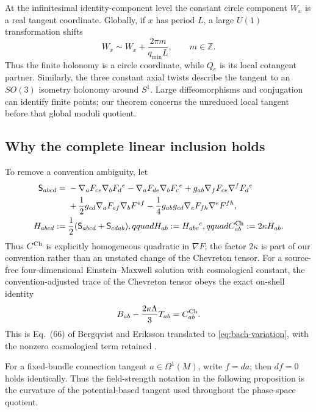 \documentclass[11pt]{article}
\theoremstyle{remark}
\begin{document}
At the infinitesimal identity-component level the constant circle component
$W_x$ is a real tangent coordinate. Globally, if $x$ has period $L$, a large
$U(1)$ transformation shifts
\begin{equation}
 W_x\sim W_x+\frac{2\pi m}{q_{\min}L},\qquad m\in\mathbb Z.
\end{equation}
Thus the finite holonomy is a circle coordinate, while $Q_e$ is its local
cotangent partner. Similarly, the three constant axial twists describe the
tangent to an $SO(3)$ isometry holonomy around $S^1$. Large diffeomorphisms
and conjugation can identify finite points; our theorem concerns the
unreduced local tangent before that global moduli quotient.

\subsection{Why the complete linear inclusion holds}
To remove a convention ambiguity, let
\begin{align}
 \mathsf S_{abcd}={}&-\nabla_aF_{ce}\nabla_bF_d{}^e
 -\nabla_aF_{de}\nabla_bF_c{}^e
 +g_{ab}\nabla_fF_{ce}\nabla^fF_d{}^e\nonumber\\
 &+\frac12g_{cd}\nabla_aF_{ef}\nabla_bF^{ef}
 -\frac14g_{ab}g_{cd}\nabla_eF_{fh}\nabla^eF^{fh},\nonumber\\
 H_{abcd}:={}&\frac12(\mathsf S_{abcd}+\mathsf S_{cdab}),qquad
 H_{ab}:=H_{abc}{}^c,qquad C^{\rm Ch}_{ab}:=2\kappa H_{ab}.
 \label{eq:chevreton-definition}
\end{align}
Thus $C^{\rm Ch}$ is explicitly homogeneous quadratic in $\nabla F$; the
factor $2\kappa$ is part of our convention rather than an unstated change of
the Chevreton tensor.
For a source-free four-dimensional Einstein--Maxwell solution with
cosmological constant, the convention-adjusted trace of the Chevreton tensor
obeys the exact on-shell identity
\begin{equation}\label{eq:chevreton-identity}
 B_{ab}-\frac{2\kappa\Lambda}{3}T_{ab}
 =C^{\rm Ch}_{ab}.
\end{equation}
This is Eq.~(66) of Bergqvist and Eriksson translated to
\eqref{eq:bach-variation}, with the nonzero cosmological term retained
\cite{BergqvistEriksson,BergqvistErikssonSenovilla}.

For a fixed-bundle connection tangent $a\in\Omega^1(M)$, write $f=da$; then
$df=0$ holds identically. Thus the field-strength notation in the following
proposition is the curvature of the potential-based tangent used throughout
the phase-space quotient.
\end{document}
